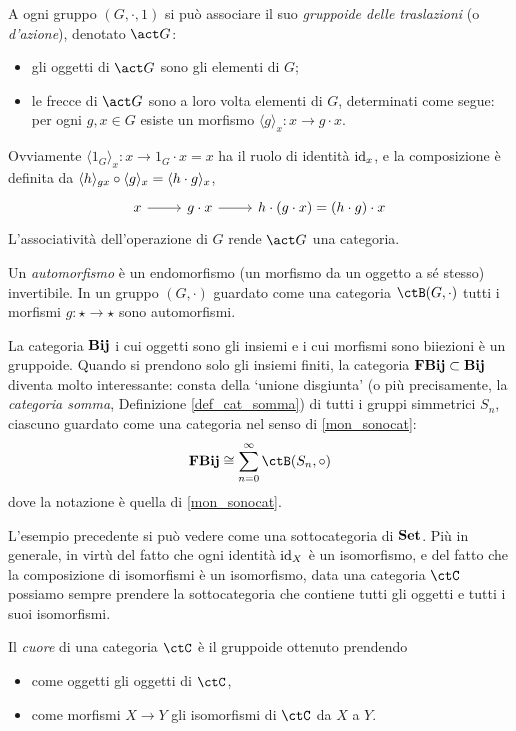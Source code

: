 \begin{example}\label{action_groupoid}
	A ogni gruppo \((G,\cdot,1)\) si può associare il suo \emph{gruppoide delle traslazioni} (o \emph{d'azione}), denotato \(\act G\):
	\begin{itemize}
		\item gli oggetti di \(\act G\) sono gli elementi di \(G\);
		\item le frecce di \(\act G\) sono a loro volta elementi di \(G\), determinati come segue: per ogni \(g,x\in G\) esiste un morfismo \(\langle g\rangle_x : x\to g\cdot x\).
	\end{itemize}
	Ovviamente \(\langle 1_G\rangle_x : x \to 1_G\cdot x=x\) ha il ruolo di identità \(\mathrm{id}_x\), e la composizione è definita da \(\langle h\rangle_{gx}\circ \langle g\rangle_x = \langle h\cdot g\rangle_x\),
	\[\begin{tikzcd}
			x \ar[r] & g\cdot x \ar[r] & h\cdot (g\cdot x) = (h\cdot g)\cdot x
		\end{tikzcd}\]
	L'associatività dell'operazione di \(G\) rende \(\act G\) una categoria.
\end{example}
\begin{definition}
	Un \emph{automorfismo} è un endomorfismo (un morfismo da un oggetto a sé stesso) invertibile. In un gruppo \((G,\cdot)\) guardato come una categoria \(\ctB(G,\cdot)\) tutti i morfismi \(g : \star\to\star\) sono automorfismi.
\end{definition}

\begin{example}\label{ex_cat_gruppoide_naturali}
	La categoria \(\mathbf{Bij}\) i cui oggetti sono gli insiemi e i cui morfismi sono biiezioni è un gruppoide. Quando si prendono solo gli insiemi finiti, la categoria \(\mathbf{FBij}\subset\mathbf{Bij}\) diventa molto interessante: consta della `unione disgiunta' (o più precisamente, la \emph{categoria somma}, Definizione \ref{def_cat_somma}) di tutti i gruppi simmetrici \(S_n\), ciascuno guardato come una categoria nel senso di \ref{mon_sonocat}:
	\[\cate{FBij}\cong \sum_{n=0}^\infty \ctB(S_n,\cmp)\]
	dove la notazione è quella di \ref{mon_sonocat}.
\end{example}

L'esempio precedente si può vedere come una sottocategoria di \(\mathbf{Set}\).
Più in generale, in virtù del fatto che ogni identità \(\mathrm{id}_X\) è un isomorfismo, e del fatto che la composizione di isomorfismi è un isomorfismo, data una categoria \(\ctC\) possiamo sempre prendere la sottocategoria che contiene tutti gli oggetti e tutti i suoi isomorfismi.
\begin{definition}\label{def_cuore}
	Il \emph{cuore} di una categoria \(\ctC\) è il gruppoide ottenuto prendendo
	\begin{itemize}
		\item come oggetti gli oggetti di \(\ctC\),
		\item come morfismi \(X\to Y\) gli isomorfismi di \(\ctC\) da \(X\) a \(Y\).
	\end{itemize}
\end{definition}


